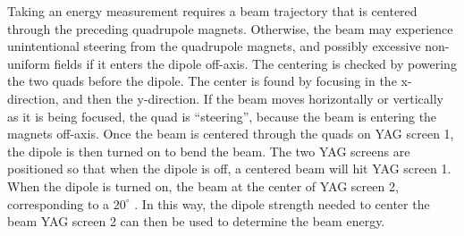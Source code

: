 Taking an energy measurement requires a beam trajectory
that is centered through the preceding quadrupole magnets. Otherwise, the beam 
may experience unintentional steering from the quadrupole magnets, and possibly excessive non-uniform fields 
if it enters the dipole off-axis. The centering is checked by powering the two 
quads before the dipole. The center is found by focusing 
in the x-direction, and then the y-direction. If the beam 
moves horizontally or vertically as it is being focused, 
the quad is ``steering'', because the beam is entering the magnets off-axis.
Once the beam is centered through the quads on YAG screen 1, 
the dipole is then turned on to bend the beam.
The two YAG screens are positioned so that when the dipole is off, 
a centered beam will hit YAG screen 1. When the dipole is turned
on,  the beam  at the center of YAG screen 2, corresponding to a 
 $20^\circ$ . In this way, the dipole strength needed to center the beam  YAG screen 2 can 
then be used to determine the beam energy.

